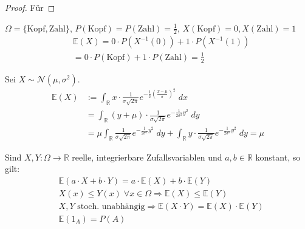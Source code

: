 \begin{proof}
Für 
\end{proof}



\begin{Beispiel}
$\Omega = \{ \text{Kopf},\text{Zahl}\}$, $P(\text{Kopf}) = P(\text{Zahl}) = \frac{1}{2}$, $X(\text{Kopf}) = 0,  X(\text{Zahl}) = 1$ 
\begin{align*}
& \mathbb{E}(X)  = 0 \cdot P(X^{-1}(0) ) + 1 \cdot P(X^{-1}(1)) \\
& =0  \cdot P(\text{Kopf}) + 1 \cdot P(\text{Zahl}) = \frac{1}{2}  
\end{align*}
\end{Beispiel}

\begin{Beispiel}
Sei $X \sim \mathcal{N}(\mu, \sigma^2)$.
\begin{align*}
\mathbb{E}(X) & := \int_{\mathbb{R}}  x \cdot  \frac 1{\sigma \sqrt{2\pi}}e^{- \frac {1}{2 } (\frac{x- \mu}{ \sigma})^2} \; dx  \\
&= \int_{\mathbb{R}}  (y + \mu) \cdot  \frac 1{\sigma \sqrt{2\pi}}e^{- \frac {1}{2 \sigma^2} y^2} \; dy \\
 &  = \mu  \int_{\mathbb{R}}      \frac 1{\sigma \sqrt{2\pi}}e^{- \frac {1}{2 \sigma^2} y^2} \; dy  + \int_{\mathbb{R}}  y  \cdot  \frac 1{\sigma \sqrt{2\pi}}e^{- \frac {1}{2 \sigma^2} y^2} \; dy = \mu
\end{align*}
\end{Beispiel}

\begin{Satz}
Sind $X,Y : \Omega \to \mathbb{R}$   reelle, integrierbare  Zufallsvariablen und $a,b \in \mathbb{R}$ konstant, so gilt:
\begin{align*}
& \mathbb{E}(a \cdot X + b \cdot Y) = a \cdot \mathbb{E}(X) + b \cdot \mathbb{E}(Y) \\
& X(x) \leq Y(x) \;  \forall x \in \Omega \Rightarrow \mathbb{E}(X) \leq \mathbb{E}(Y) \\
& X ,Y \text{ stoch. unabhängig} \Rightarrow   \mathbb{E}(X \cdot Y) =  \mathbb{E}(X) \cdot  \mathbb{E}(Y) \\
& \mathbb{E} (1_A) = P (A)
\end{align*}
\end{Satz}

